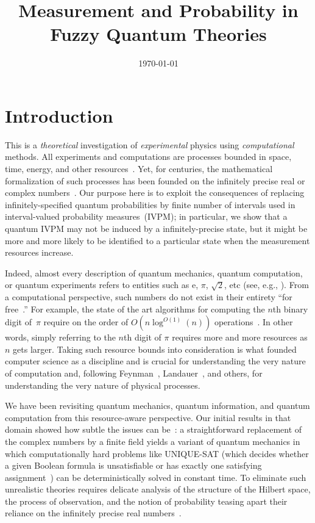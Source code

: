\documentclass{article}
\theoremstyle{remark}
\newcommand{\rme}{\mathrm{e}}
\begin{document}
\title{Measurement and Probability in Fuzzy Quantum Theories}
\date{\today}
\maketitle 

\section{Introduction}

This is a \emph{theoretical} investigation of \emph{experimental}
physics using \emph{computational} methods. All experiments and computations
are processes bounded in space, time, energy, and other resources~\cite{Jaeger2007,Piccinini2015}.
Yet, for centuries, the mathematical formalization of such processes
has been founded on the infinitely precise real or complex numbers~\cite{Ziegler2007,weihrauch2012computable,blum2012complexity}.
Our purpose here is to exploit the consequences of replacing infinitely-specified
quantum probabilities by finite number of intervals used in interval-valued
probability measures~(IVPM); in particular, we show that a quantum
IVPM may not be induced by a infinitely-precise state, but it might
be more and more likely to be identified to a particular state when
the measurement resources increase.

Indeed, almost every description of quantum mechanics, quantum computation,
or quantum experiments refers to entities such as $\rme$, $\pi$,
$\sqrt{2}$, etc (see, e.g., \cite{Redhead1987-REDINA,544199,Mermin2007}).
From a computational perspective, such numbers do not exist in their
entirety ``for free~\cite{Kent1999,CliftonKent2000}.'' For example,
the state of the art algorithms for computing the $n$th binary digit
of~$\pi$ require on the order of $O\left(n\log^{O\left(1\right)}\left(n\right)\right)$
operations~\cite{journals/moc/BaileyBP97}. In other words, simply
referring to the $n$th digit of $\pi$ requires more and more resources
as $n$ gets larger. Taking such resource bounds into consideration
is what founded computer science as a discipline and is crucial for
understanding the very nature of computation and, following Feynman~\cite{Feynman1982Simulating},
Landauer~\cite{Landauer1996188}, and others, for understanding the
very nature of physical processes.

We have been revisiting quantum mechanics, quantum information, and
quantum computation from this resource-aware perspective. Our initial
results in that domain showed how subtle the issues can be~\cite{usat,geometry2013,DQT2014}:
a straightforward replacement of the complex numbers by a finite field
yields a variant of quantum mechanics in which computationally hard
problems like UNIQUE-SAT (which decides whether a given Boolean formula
is unsatisfiable or has exactly one satisfying assignment~\cite{Valiant198685,Papadimitriou1993,AroraBarak2009})
can be deterministically solved in constant time. To eliminate such
unrealistic theories requires delicate analysis of the structure of
the Hilbert space, the process of observation, and the notion of probability
teasing apart their reliance on the infinitely precise real numbers~\cite{geometry2013,DQT2014}. 
\end{document}
